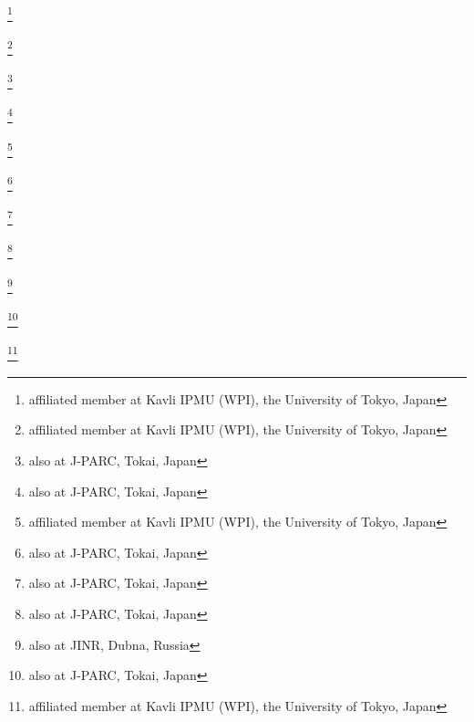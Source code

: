 \author{C.\,McGrew}\INSTFJ
\author{A.\,Mefodiev}\INSTEB
\author{C.\,Metelko}\INSTFC
\author{M.\,Mezzetto}\INSTBF
\author{A.\,Minamino}\INSTHE
\author{O.\,Mineev}\INSTEB
\author{S.\,Mine}\INSTGA
\author{A.\,Missert}\INSTGB
\author{M.\,Miura}\thanks{affiliated member at Kavli IPMU (WPI), the University of Tokyo, Japan}\INSTBJ
\author{S.\,Moriyama}\thanks{affiliated member at Kavli IPMU (WPI), the University of Tokyo, Japan}\INSTBJ
\author{J.\,Morrison}\INSTHB
\author{Th.A.\,Mueller}\INSTBA
\author{T.\,Nakadaira}\thanks{also at J-PARC, Tokai, Japan}\INSTCB
\author{M.\,Nakahata}\INSTBJ\INSTHA
\author{K.G.\,Nakamura}\INSTCD
\author{K.\,Nakamura}\thanks{also at J-PARC, Tokai, Japan}\INSTHA\INSTCB
\author{K.D.\,Nakamura}\INSTCD
\author{Y.\,Nakanishi}\INSTCD
\author{S.\,Nakayama}\thanks{affiliated member at Kavli IPMU (WPI), the University of Tokyo, Japan}\INSTBJ
\author{T.\,Nakaya}\INSTCD\INSTHA
\author{K.\,Nakayoshi}\thanks{also at J-PARC, Tokai, Japan}\INSTCB
\author{C.\,Nantais}\INSTF
\author{C.\,Nielsen}\INSTD\INSTB
\author{K.\,Nishikawa}\thanks{also at J-PARC, Tokai, Japan}\INSTCB
\author{Y.\,Nishimura}\INSTCG
\author{P.\,Novella}\INSTEC
\author{J.\,Nowak}\INSTEJ
\author{H.M.\,O'Keeffe}\INSTEJ
\author{K.\,Okumura}\INSTCG\INSTHA
\author{T.\,Okusawa}\INSTCF
\author{W.\,Oryszczak}\INSTDJ
\author{S.M.\,Oser}\INSTD\INSTB
\author{T.\,Ovsyannikova}\INSTEB
\author{R.A.\,Owen}\INSTFA
\author{Y.\,Oyama}\thanks{also at J-PARC, Tokai, Japan}\INSTCB
\author{V.\,Palladino}\INSTBE
\author{J.L.\,Palomino}\INSTFJ
\author{V.\,Paolone}\INSTGC
\author{N.D.\,Patel}\INSTCD
\author{P.\,Paudyal}\INSTFC
\author{M.\,Pavin}\INSTBB
\author{D.\,Payne}\INSTFC
\author{Y.\,Petrov}\INSTD\INSTB
\author{L.\,Pickering}\INSTEI
\author{E.S.\,Pinzon Guerra}\INSTH
\author{C.\,Pistillo}\INSTEE
\author{B.\,Popov}\thanks{also at JINR, Dubna, Russia}\INSTBB
\author{M.\,Posiadala-Zezula}\INSTDJ
\author{J.-M.\,Poutissou}\INSTB
\author{A.\,Pritchard}\INSTFC
\author{P.\,Przewlocki}\INSTDF
\author{B.\,Quilain}\INSTCD
\author{T.\,Radermacher}\INSTBC
\author{E.\,Radicioni}\INSTGF
\author{P.N.\,Ratoff}\INSTEJ
\author{M.A.\,Rayner}\INSTEG
\author{E.\,Reinherz-Aronis}\INSTFG
\author{C.\,Riccio}\INSTBE
\author{E.\,Rondio}\INSTDF
\author{B.\,Rossi}\INSTBE
\author{S.\,Roth}\INSTBC
\author{A.C.\,Ruggeri}\INSTBE
\author{A.\,Rychter}\INSTDH
\author{K.\,Sakashita}\thanks{also at J-PARC, Tokai, Japan}\INSTCB
\author{F.\,S\'anchez}\INSTED
\author{E.\,Scantamburlo}\INSTEG
\author{K.\,Scholberg}\thanks{affiliated member at Kavli IPMU (WPI), the University of Tokyo, Japan}\INSTFH
\author{J.\,Schwehr}\INSTFG
\author{M.\,Scott}\INSTB
